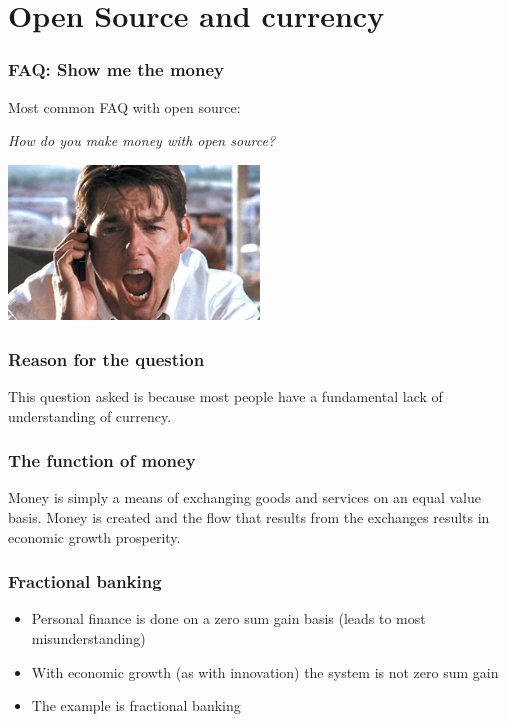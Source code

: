 \documentclass{beamer}
\begin{document}



\section{Open Source and currency}


\begin{frame}
\frametitle{FAQ:  Show me the money}

Most common FAQ with open source:  

\begin{center}

\emph{How do you make money with open source?}

\includegraphics[width = 0.5\textwidth]{Pictures/showmethemoney.jpg}
\end{center}
\end{frame}


\begin{frame}
\frametitle{Reason for the question}

\begin{center}

This question asked is because most people have a fundamental lack of understanding of currency.

\end{center}
\end{frame}


\begin{frame}
\frametitle{The function of money}

Money is simply a means of exchanging goods and services on an equal value basis. Money is created and the flow that results from the exchanges results in economic growth prosperity.

\end{frame}

\begin{frame}
\frametitle{Fractional banking}

\begin{itemize}
\item Personal finance is done on a zero sum gain basis (leads to most misunderstanding)
\item With economic growth (as with innovation) the system is not zero sum gain
\item The example is fractional banking
\end{itemize}

\end{frame}
\end{document}
